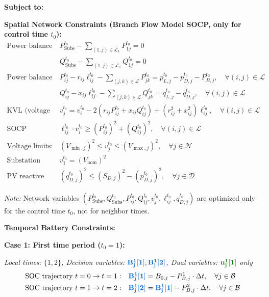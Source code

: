 \documentclass[11pt]{article}
\newcommand{\blueB}[1]{\textcolor{bluevar}{\mathbf{#1}}}      %
\newcommand{\greenu}[1]{\textcolor{greenvar}{\mathbf{#1}}}    %
\begin{document}
\textbf{Subject to:}

\textbf{Spatial Network Constraints (Branch Flow Model SOCP, only for control time $t_0$):}
\begin{align}
\text{Power balance (substation):} \quad & P_{\text{Subs}}^{t_0} - \sum_{(1,j) \in \mathcal{L}_1} P_{1j}^{t_0} = 0 \label{eq:pbal_sub}\\
& Q_{\text{Subs}}^{t_0} - \sum_{(1,j) \in \mathcal{L}_1} Q_{1j}^{t_0} = 0 \label{eq:qbal_sub}\\
\text{Power balance (nodes):} \quad & P_{ij}^{t_0} - r_{ij}\ell_{ij}^{t_0} - \sum_{(j,k) \in \mathcal{L}} P_{jk}^{t_0} = p_{L,j}^{t_0} - p_{D,j}^{t_0} - P_{B,j}^{t_0}, \quad \forall (i,j) \in \mathcal{L} \label{eq:pbal_node}\\
& Q_{ij}^{t_0} - x_{ij}\ell_{ij}^{t_0} - \sum_{(j,k) \in \mathcal{L}} Q_{jk}^{t_0} = q_{L,j}^{t_0} - q_{D,j}^{t_0}, \quad \forall (i,j) \in \mathcal{L} \label{eq:qbal_node}\\
\text{KVL (voltage drop):} \quad & v_j^{t_0} = v_i^{t_0} - 2(r_{ij} P_{ij}^{t_0} + x_{ij} Q_{ij}^{t_0}) + (r_{ij}^2+x_{ij}^2)\ell_{ij}^{t_0}, \quad \forall (i,j) \in \mathcal{L} \label{eq:kvl}\\
\text{SOCP relaxation:} \quad & \ell_{ij}^{t_0} \cdot v_i^{t_0} \geq (P_{ij}^{t_0})^2 + (Q_{ij}^{t_0})^2, \quad \forall (i,j) \in \mathcal{L} \label{eq:socp}\\
\text{Voltage limits:} \quad & (V_{\min,j})^2 \leq v_j^{t_0} \leq (V_{\max,j})^2, \quad \forall j \in \mathcal{N} \label{eq:vlim}\\
\text{Substation voltage:} \quad & v_1^{t_0} = (V_{\text{nom}})^2 \label{eq:vsub}\\
\text{PV reactive limits:} \quad & (q_{D,j}^{t_0})^2 \leq (S_{D,j})^2 - (p_{D,j}^{t_0})^2, \quad \forall j \in \mathcal{D} \label{eq:pvq}
\end{align}

\textit{Note:} Network variables $(P_{\text{Subs}}^{t_0}, Q_{\text{Subs}}^{t_0}, P_{ij}^{t_0}, Q_{ij}^{t_0}, v_j^{t_0}, \ell_{ij}^{t_0}, q_{D,j}^{t_0})$ are optimized only for the control time $t_0$, not for neighbor times.

\textbf{Temporal Battery Constraints:}

\noindent\textbf{Case 1: First time period ($t_0 = 1$):}

\textit{Local times: $\{1, 2\}$, Decision variables: $\blueB{B_j^{1}[1]}, \blueB{B_j^{1}[2]}$, Dual variables: $\greenu{u_j^{1}[1]}$ only}
\begin{align}
\text{SOC trajectory } t=0 \to t=1: \quad & \blueB{B_j^{1}[1]} = B_{0,j} - P_{B,j}^1 \cdot \Delta t, \quad \forall j \in \mathcal{B} \\
\text{SOC trajectory } t=1 \to t=2: \quad & \blueB{B_j^{1}[2]} = \blueB{B_j^{1}[1]} - P_{B,j}^2 \cdot \Delta t, \quad \forall j \in \mathcal{B}
\end{align}
\end{document}

